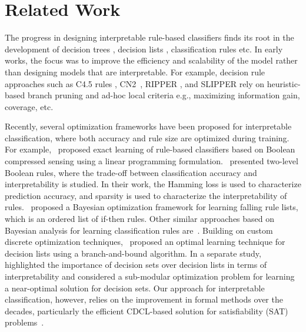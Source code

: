 \section{Related Work}
\label{interpretability_imli_sec:related}

The progress in designing interpretable rule-based classifiers finds its root in the development of decision trees \cite{bessiere2009minimising,quinlan1986induction,quinlan1987simplifying}, decision lists \cite{rivest1987learning}, classification rules \cite{cohen1995fast} etc.  In early works, the focus was to improve the efficiency and scalability of the model rather than designing models that are interpretable. For example,  decision rule approaches such as  C4.5 rules \cite{quinlan2014}, CN2~\cite{ClarkN1989}, RIPPER \cite{cohen1995fast}, and SLIPPER  \cite{CohenS1999} 
rely on heuristic-based branch pruning and ad-hoc local criteria e.g., maximizing information gain, coverage, etc.

Recently, several optimization frameworks have been proposed for interpretable classification, where both accuracy and rule size are optimized during training. For example,~\cite{malioutov2013exact} proposed exact learning of rule-based classifiers based on Boolean compressed sensing using a linear programming formulation.~\cite{su2016learning} presented two-level Boolean rules, where the trade-off between classification accuracy and interpretability is studied. In their work, the Hamming loss is used to characterize prediction accuracy, and sparsity is used to characterize the interpretability of rules.~\cite{wang2015falling} proposed a Bayesian optimization framework for learning falling rule lists, which is an ordered list of if-then rules. Other similar approaches based on Bayesian analysis for learning classification rules are~\cite{letham2015interpretable,wang2017bayesian}. Building on custom discrete optimization techniques,~\cite{angelino2017learning} proposed an optimal learning technique for decision lists using a branch-and-bound algorithm. In a separate study,~\cite{lakkaraju2016interpretable} highlighted the importance of decision sets over decision lists in terms of interpretability and considered a sub-modular optimization problem for learning a near-optimal solution for decision sets. Our approach for interpretable classification, however, relies on the improvement in formal methods over the decades, particularly the efficient CDCL-based solution for satisfiability (SAT) problems~\cite{silva2003grasp}. 



